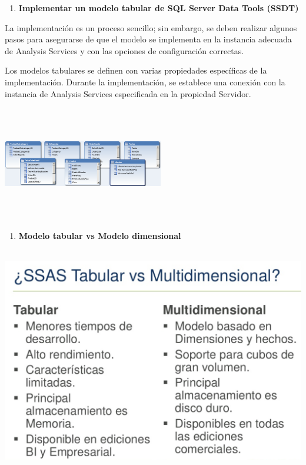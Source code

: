 \noindent 


\begin{enumerate}
\item  \textbf{Implementar un modelo tabular de SQL Server Data Tools (SSDT)}
\end{enumerate}

\noindent \textbf{}

\noindent La implementaci\'{o}n es un proceso sencillo; sin embargo, se deben realizar algunos pasos para asegurarse de que el modelo se implementa en la instancia adecuada de Analysis Services y con las opciones de configuraci\'{o}n correctas.

\noindent 

\noindent Los modelos tabulares se definen con varias propiedades espec\'{i}ficas de la implementaci\'{o}n. Durante la implementaci\'{o}n, se establece una conexi\'{o}n con la instancia de Analysis Services especificada en la propiedad Servidor. 

\noindent 

\begin{center}
\includegraphics[width=7cm, height=5cm]{Imagenes/modelo_tabular}
\end{center}



\begin{enumerate}
\item  \textbf{Modelo tabular vs Modelo dimensional }
\end{enumerate}



\begin{center}
\includegraphics[width=15cm, height=10cm]{Imagenes/modelo_tabular_vs_dimensional}
\end{center}


